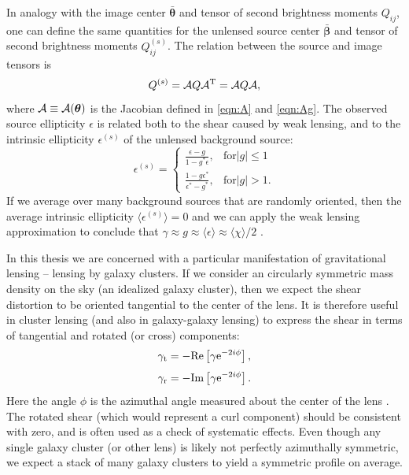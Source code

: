 In analogy with the image center $\bm{\bar{\theta}}$ and tensor of second brightness moments $Q_{ij}$, one can define the same quantities for the unlensed source center $\bm{\bar{\beta}}$ and tensor of second brightness moments $Q_{ij}^{(s)}$. The relation between the source and image tensors is
\begin{equation}
Q^{(s)} = {\cal A} Q {\cal A}^{\rm T} = {\cal A} Q {\cal A},
\end{equation}
where ${\cal A} \equiv {\cal A}(\bm{\theta})$ is the Jacobian defined in \autoref{eqn:A} and \autoref{eqn:Ag}. The observed source ellipticity $\epsilon$ is related both to the shear caused by weak lensing, and to the intrinsic ellipticity $\epsilon^{(s)}$ of the unlensed background source:
\begin{equation} 
\epsilon^{(s)} = 
    \begin{cases}
        \frac{\epsilon - g}{1-g^*\epsilon}, & \text{for} |g| \le 1 \\
        \frac{1-g\epsilon^*}{\epsilon^* - g^*}, & \text{for} |g| > 1.
    \end{cases}
\end{equation}
If we average over many background sources that are randomly oriented, then the average intrinsic ellipticity $\langle \epsilon^{(s)} \rangle = 0$ and we can apply the weak lensing approximation to conclude that $\gamma \approx g \approx \langle \epsilon \rangle \approx  \langle \chi \rangle /2$ \citep{BS01}. 

In this thesis we are concerned with a particular manifestation of gravitational lensing -- lensing by galaxy clusters. If we consider an circularly symmetric mass density on the sky (an idealized galaxy cluster), then we expect the shear distortion to be oriented tangential to the center of the lens. It is therefore useful in cluster lensing (and also in galaxy-galaxy lensing) to express the shear in terms of tangential and rotated (or cross) components:
\begin{equation}
\gamma_{\rm t} = -{\rm Re}\left[ \gamma {\rm e}^{-2i\phi} \right],  
\end{equation}
\begin{equation}
\gamma_{\rm r} = -{\rm Im}\left[ \gamma {\rm e}^{-2i\phi} \right].
\end{equation}
Here the angle $\phi$ is the azimuthal angle measured about the center of the lens \citep{Schneider06_WeakGravLens}. The rotated shear (which would represent a curl component) should be consistent with zero, and is often used as a check of systematic effects. Even though any single galaxy cluster (or other lens) is likely not perfectly azimuthally symmetric, we expect a stack of many galaxy clusters to yield a symmetric profile on average.

